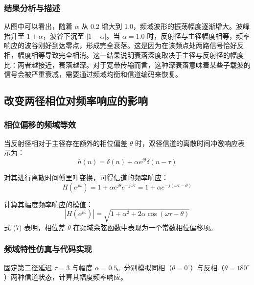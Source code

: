 \documentclass[a4paper, 11pt]{ctexart}
\begin{document}
\subsubsection{结果分析与描述}
从图中可以看出，随着 $\alpha$ 从 0.2 增大到 1.0，频域波形的振荡幅度逐渐增大。波峰抬升至 $1+\alpha$，波谷下沉至 $|1-\alpha|$。当 $\alpha = 1.0$ 时，反射径与主径幅度相等，频率响应的波谷刚好到达零点，形成完全衰落。这是因为在该频点处两路信号恰好反相，幅度相等导致完全相消。这一结果说明衰落深度取决于主径与反射径的幅度比：两者越接近，衰落越深。对于宽带传输而言，这种深衰落意味着某些子载波的信号会被严重衰减，需要通过频域均衡和信道编码来恢复。
\subsection{改变两径相位对频率响应的影响}

\subsubsection{相位偏移的频域等效}
当反射径相对于主径存在额外的相位偏差 $\theta$ 时，双径信道的离散时间冲激响应表示为：
\begin{equation}
    h(n) = \delta(n) + \alpha e^{j\theta} \delta(n - \tau)
\end{equation}

对其进行离散时间傅里叶变换，可得信道的频率响应：
\begin{equation}
    H(e^{j\omega}) = 1 + \alpha e^{j\theta} e^{-j\omega\tau} = 1 + \alpha e^{-j(\omega\tau - \theta)}
\end{equation}

计算其幅度频率响应的模值：
\begin{equation}
    |H(e^{j\omega})| = \sqrt{1 + \alpha^2 + 2\alpha \cos(\omega\tau - \theta)}
\end{equation}
式 (7) 表明，相位差 $\theta$ 在频域余弦函数中表现为一个常数相位偏移项。

\subsubsection{频域特性仿真与代码实现}
固定第二径延迟 $\tau = 3$ 与幅度 $\alpha = 0.5$。分别模拟同相（$\theta = 0^\circ$）与反相（$\theta = 180^\circ$）两种信道状态，计算其幅度频率响应。
\end{document}
